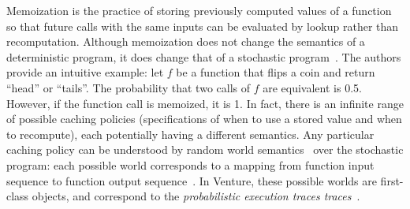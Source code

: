 Memoization is the practice of storing previously computed values of a function so that future calls with the same inputs can be evaluated by lookup rather than recomputation.
Although memoization does not change the semantics of a deterministic program, it does change that of a stochastic program~\citep{goodman2008church}. The authors provide an intuitive example: let $f$ be a function that flips a coin and return ``head'' or ``tails''. The probability that two calls of $f$ are equivalent is 0.5. However, if the function call is memoized, it is 1.
In fact, there is an infinite range of possible caching policies (specifications of when to use a stored value and when to recompute), each potentially having a different semantics.
Any particular caching policy can be understood by random world semantics~\citep{poole1993probabilistic,sato1995statistical} over the stochastic program: each possible world corresponds to a mapping from function input sequence to function output sequence~\citep{mcallester2008random}.
In Venture, these possible worlds are first-class objects, and correspond to the {\em probabilistic execution traces traces}~\citep{mansinghka2014venture}.

